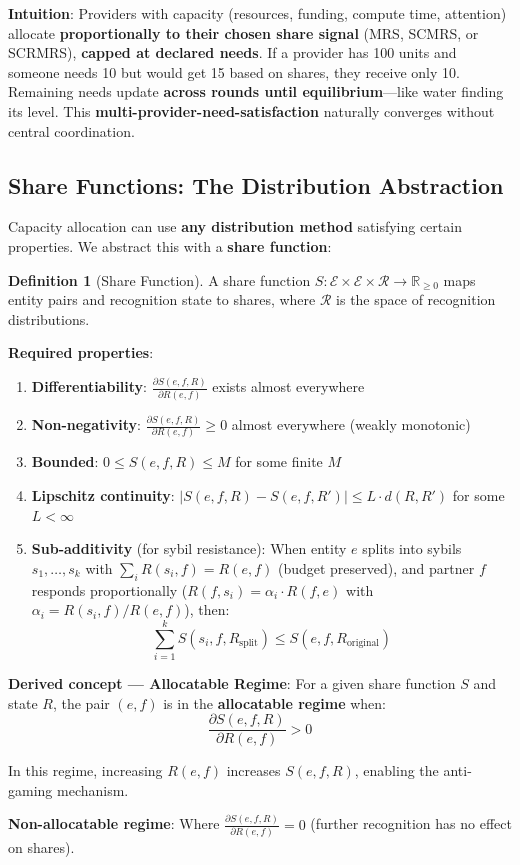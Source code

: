 \documentclass[11pt,a4paper]{article}
\theoremstyle{definition}
\newtheorem{definition}[theorem]{Definition}
\theoremstyle{remark}
\newcommand{\E}{\mathcal{E}}
\begin{document}
\textbf{Intuition}: Providers with capacity (resources, funding, compute time, attention) allocate \textbf{proportionally to their chosen share signal} (MRS, SCMRS, or SCRMRS), \textbf{capped at declared needs}. If a provider has 100 units and someone needs 10 but would get 15 based on shares, they receive only 10. Remaining needs update \textbf{across rounds until equilibrium}---like water finding its level. This \textbf{multi-provider-need-satisfaction} naturally converges without central coordination.

\subsection{Share Functions: The Distribution Abstraction}

Capacity allocation can use \textbf{any distribution method} satisfying certain properties. We abstract this with a \textbf{share function}:

\begin{definition}[Share Function]
A share function $S: \E \times \E \times \mathcal{R} \to \mathbb{R}_{\ge 0}$ maps entity pairs and recognition state to shares, where $\mathcal{R}$ is the space of recognition distributions.

\textbf{Required properties}:
\begin{enumerate}
\item \textbf{Differentiability}: $\frac{\partial S(e,f,R)}{\partial R(e,f)}$ exists almost everywhere
\item \textbf{Non-negativity}: $\frac{\partial S(e,f,R)}{\partial R(e,f)} \ge 0$ almost everywhere (weakly monotonic)
\item \textbf{Bounded}: $0 \le S(e,f,R) \le M$ for some finite $M$
\item \textbf{Lipschitz continuity}: $|S(e,f,R) - S(e,f,R')| \le L \cdot d(R, R')$ for some $L < \infty$
\item \textbf{Sub-additivity} (for sybil resistance): When entity $e$ splits into sybils $s_1, \ldots, s_k$ with $\sum_i R(s_i, f) = R(e, f)$ (budget preserved), and partner $f$ responds proportionally ($R(f, s_i) = \alpha_i \cdot R(f, e)$ with $\alpha_i = R(s_i, f) / R(e, f)$), then:
\[ \sum_{i=1}^k S(s_i, f, R_{\text{split}}) \le S(e, f, R_{\text{original}}) \]
\end{enumerate}

\textbf{Derived concept --- Allocatable Regime}:
For a given share function $S$ and state $R$, the pair $(e,f)$ is in the \textbf{allocatable regime} when:
\[ \frac{\partial S(e,f,R)}{\partial R(e,f)} > 0 \]

In this regime, increasing $R(e,f)$ increases $S(e,f,R)$, enabling the anti-gaming mechanism.

\textbf{Non-allocatable regime}: Where $\frac{\partial S(e,f,R)}{\partial R(e,f)} = 0$ (further recognition has no effect on shares).
\end{definition}
\end{document}
